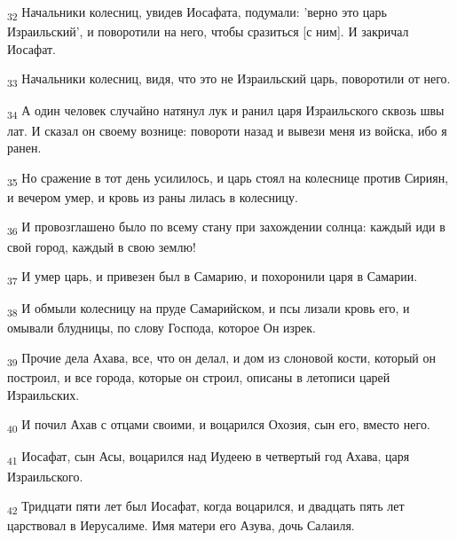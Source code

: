 \begin{tcolorbox}
\textsubscript{32} Начальники колесниц, увидев Иосафата, подумали: 'верно это царь Израильский', и поворотили на него, чтобы сразиться [с ним]. И закричал Иосафат.
\end{tcolorbox}
\begin{tcolorbox}
\textsubscript{33} Начальники колесниц, видя, что это не Израильский царь, поворотили от него.
\end{tcolorbox}
\begin{tcolorbox}
\textsubscript{34} А один человек случайно натянул лук и ранил царя Израильского сквозь швы лат. И сказал он своему вознице: повороти назад и вывези меня из войска, ибо я ранен.
\end{tcolorbox}
\begin{tcolorbox}
\textsubscript{35} Но сражение в тот день усилилось, и царь стоял на колеснице против Сириян, и вечером умер, и кровь из раны лилась в колесницу.
\end{tcolorbox}
\begin{tcolorbox}
\textsubscript{36} И провозглашено было по всему стану при захождении солнца: каждый иди в свой город, каждый в свою землю!
\end{tcolorbox}
\begin{tcolorbox}
\textsubscript{37} И умер царь, и привезен был в Самарию, и похоронили царя в Самарии.
\end{tcolorbox}
\begin{tcolorbox}
\textsubscript{38} И обмыли колесницу на пруде Самарийском, и псы лизали кровь его, и омывали блудницы, по слову Господа, которое Он изрек.
\end{tcolorbox}
\begin{tcolorbox}
\textsubscript{39} Прочие дела Ахава, все, что он делал, и дом из слоновой кости, который он построил, и все города, которые он строил, описаны в летописи царей Израильских.
\end{tcolorbox}
\begin{tcolorbox}
\textsubscript{40} И почил Ахав с отцами своими, и воцарился Охозия, сын его, вместо него.
\end{tcolorbox}
\begin{tcolorbox}
\textsubscript{41} Иосафат, сын Асы, воцарился над Иудеею в четвертый год Ахава, царя Израильского.
\end{tcolorbox}
\begin{tcolorbox}
\textsubscript{42} Тридцати пяти лет был Иосафат, когда воцарился, и двадцать пять лет царствовал в Иерусалиме. Имя матери его Азува, дочь Салаиля.
\end{tcolorbox}

